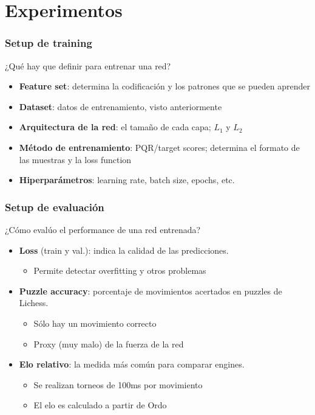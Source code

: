 
\section{Experimentos}

\begin{frame}
\frametitle{Setup de training}
¿Qué hay que definir para entrenar una red? \pause
\begin{itemize}
\item \textbf{Feature set}: determina la codificación y los patrones que se pueden aprender \pause
\item \textbf{Dataset}: datos de entrenamiento, visto anteriormente \pause
\item \textbf{Arquitectura de la red}: el tamaño de cada capa; $L_1$ y $L_2$ \pause
\item \textbf{Método de entrenamiento}: PQR/target scores; determina el formato de las muestras y la loss function  \pause
\item \textbf{Hiperparámetros}: learning rate, batch size, epochs, etc.
\end{itemize}
\end{frame}

\begin{frame}
\frametitle{Setup de evaluación}
¿Cómo evalúo el performance de una red entrenada? \pause
\begin{itemize}
\item \textbf{Loss} (train y val.): indica la calidad de las predicciones.
\begin{itemize}
    \item Permite detectar overfitting y otros problemas \pause
\end{itemize}
\item \textbf{Puzzle accuracy}: porcentaje de movimientos acertados en puzzles de Lichess.
\begin{itemize}
    \item Sólo hay un movimiento correcto
    \item Proxy (muy malo) de la fuerza de la red \pause
\end{itemize}
\item \textbf{Elo relativo}: la medida más común para comparar engines.
\begin{itemize}
    \item Se realizan torneos de 100ms por movimiento
    \item El elo es calculado a partir de Ordo
\end{itemize}
\end{itemize}
\end{frame}

